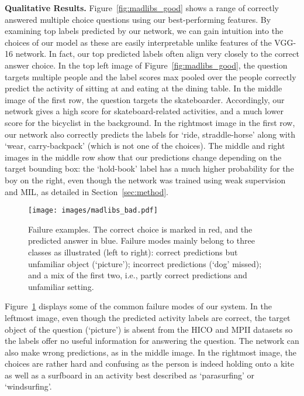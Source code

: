 \documentclass[runningheads]{llncs}
\begin{document}
{\bf Qualitative Results.} Figure~\ref{fig:madlibs_good} shows a range of correctly answered multiple choice questions using our best-performing features. By examining top labels predicted by our network, we can gain intuition into the choices of our model as these are easily interpretable unlike  features of the VGG-16 network. In fact, our top predicted labels often align very closely to the correct answer choice. In the top left image of Figure~\ref{fig:madlibs_good}, the question targets multiple people and the label scores max pooled over the people correctly predict the activity of sitting at and eating at the dining table. In the middle image of the first row, the question targets the skateboarder. Accordingly, our network gives a high score for skateboard-related activities, and a much lower score for the bicyclist in the background. In the rightmost image in the first row, our network also correctly predicts the labels for `ride, straddle-horse' along with `wear, carry-backpack' (which is not one of the choices). The middle and right images in the middle row show that our predictions change depending on the target bounding box: the `hold-book' label has a much higher probability for the boy on the right, even though the network was trained using weak supervision and MIL, as detailed in Section~\ref{sec:method}. 

\begin{figure}[t!]
    \centering
    \texttt{[image: images/madlibs\_bad.pdf]}
    \caption{Failure examples. The correct choice is marked in red, and the predicted answer in blue. Failure modes mainly belong to three classes as illustrated (left to right): correct predictions but unfamiliar object (`picture'); incorrect predictions (`dog' missed); and a mix of the first two, i.e., partly correct predictions and unfamiliar setting.}
    \label{fig:madlibs_bad}
\end{figure}

Figure~\ref{fig:madlibs_bad} displays some of the common failure modes of our system. In the leftmost image, even though the predicted activity labels are correct, the target object of the question (`picture') is absent from the HICO and MPII datasets so the labels offer no useful information for answering the question. The network can also make wrong predictions, as in the middle image. In the rightmost image, the choices are rather hard and confusing as the person is indeed holding onto a kite as well as a surfboard in an activity best described as `parasurfing' or `windsurfing'.
\end{document}
